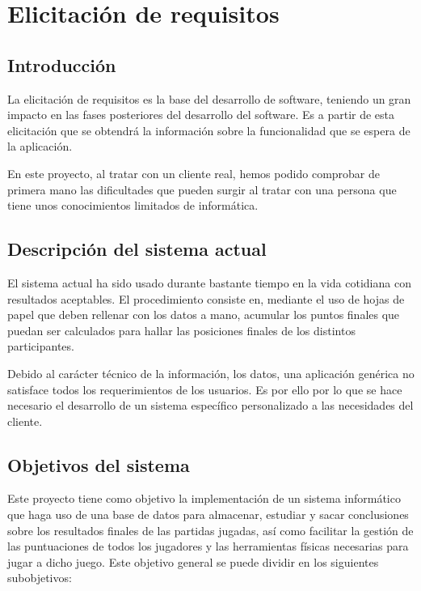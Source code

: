 \chapter{Elicitación de requisitos}\label{cap:elicitación_sistema}

\section{Introducción}

La elicitación de requisitos es la base del desarrollo de software, teniendo un gran impacto en las fases posteriores del desarrollo del software. Es a partir de esta elicitación que se obtendrá la información sobre la funcionalidad que se espera de la aplicación.

En este proyecto, al tratar con un cliente real, hemos podido comprobar de primera mano las dificultades que pueden surgir al tratar con una persona que tiene unos conocimientos limitados de informática.


\section{Descripción del sistema actual}

El sistema actual ha sido usado durante bastante tiempo en la vida cotidiana con resultados aceptables. El procedimiento consiste en, mediante el uso de hojas de papel que deben rellenar con los datos a mano, acumular los puntos finales que puedan ser calculados para hallar las posiciones finales de los distintos participantes.

Debido al carácter técnico de la información, los datos, una aplicación genérica no satisface todos los requerimientos de los usuarios. Es por ello por lo que se hace necesario el desarrollo de un sistema específico personalizado a las necesidades del cliente.

\section{Objetivos del sistema}

Este proyecto tiene como objetivo la implementación de un sistema informático que haga uso de una base de datos para almacenar, estudiar y sacar conclusiones sobre los resultados finales de las partidas jugadas, así como facilitar la gestión de las puntuaciones de todos los jugadores y las herramientas físicas necesarias para jugar a dicho juego. Este objetivo general se puede dividir en los siguientes subobjetivos:

